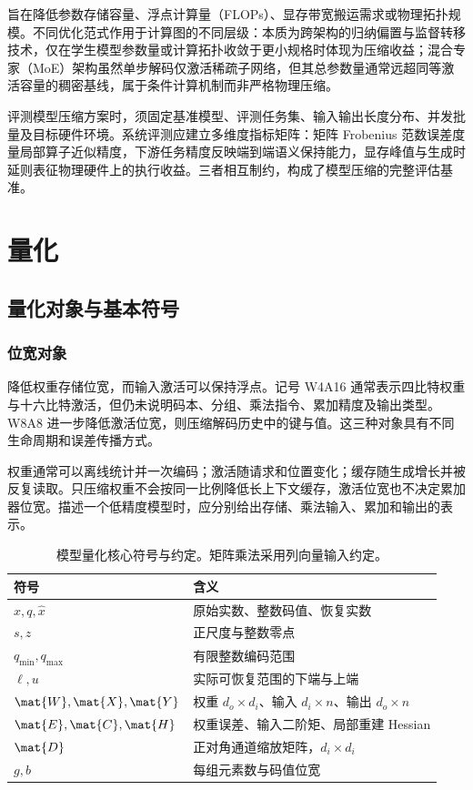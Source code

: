 \documentclass[../textbook.tex]{subfiles}
\begin{document}
旨在降低参数存储容量、浮点计算量（FLOPs）、显存带宽搬运需求或物理拓扑规模。不同优化范式作用于计算图的不同层级：本质为跨架构的归纳偏置与监督转移技术，仅在学生模型参数量或计算拓扑收敛于更小规格时体现为压缩收益；混合专家（MoE）架构虽然单步解码仅激活稀疏子网络，但其总参数量通常远超同等激活容量的稠密基线，属于条件计算机制而非严格物理压缩。

评测模型压缩方案时，须固定基准模型、评测任务集、输入输出长度分布、并发批量及目标硬件环境。系统评测应建立多维度指标矩阵：矩阵 Frobenius 范数误差度量局部算子近似精度，下游任务精度反映端到端语义保持能力，显存峰值与生成时延则表征物理硬件上的执行收益。三者相互制约，构成了模型压缩的完整评估基准。

\section{量化}
\subsection{量化对象与基本符号}

\subsubsection{位宽对象}
降低权重存储位宽，而输入激活可以保持浮点。记号 W4A16 通常表示四比特权重与十六比特激活，但仍未说明码本、分组、乘法指令、累加精度及输出类型。W8A8 进一步降低激活位宽，则压缩解码历史中的键与值。这三种对象具有不同生命周期和误差传播方式。

权重通常可以离线统计并一次编码；激活随请求和位置变化；缓存随生成增长并被反复读取。只压缩权重不会按同一比例降低长上下文缓存，激活位宽也不决定累加器位宽。描述一个低精度模型时，应分别给出存储、乘法输入、累加和输出的表示。

\begin{table}[htbp]
\centering
\caption[模型量化核心符号与约定]{模型量化核心符号与约定。矩阵乘法采用列向量输入约定。}\label{tab:model-optimization-symbols}
\begin{tabular}{ll}
\toprule
符号 & 含义\\
\midrule
$x,q,\widehat x$ & 原始实数、整数码值、恢复实数\\
$s,z$ & 正尺度与整数零点\\
$q_{\min},q_{\max}$ & 有限整数编码范围\\
$\ell,u$ & 实际可恢复范围的下端与上端\\
$\mat{W},\mat{X},\mat{Y}$ & 权重 $d_o\times d_i$、输入 $d_i\times n$、输出 $d_o\times n$\\
$\mat{E},\mat{C},\mat{H}$ & 权重误差、输入二阶矩、局部重建 Hessian\\
$\mat{D}$ & 正对角通道缩放矩阵，$d_i\times d_i$\\
$g,b$ & 每组元素数与码值位宽\\
\bottomrule
\end{tabular}
\end{table}
\end{document}
